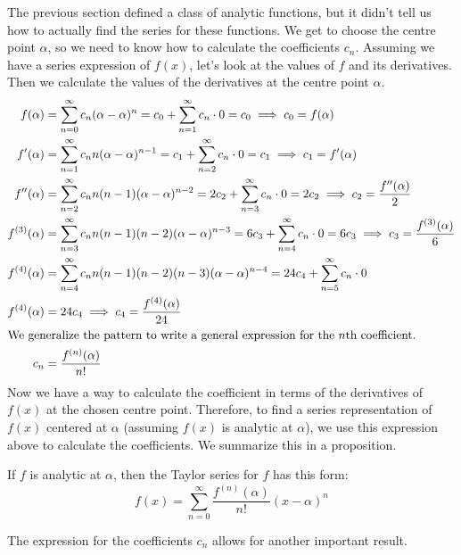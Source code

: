 \documentclass[fleqn]{report}
\begin{document}
The previous section defined a class of analytic functions,
but it didn't tell us how to actually find the series for
these functions. We get to choose the centre point $\alpha$,
so we need to know how to calculate the
coefficients $c_n$. Assuming we have a series expression of
$f(x)$, let's look at the values of $f$ and its derivatives.
Then we calculate the values of the derivatives at the centre
point $\alpha$. 
\begin{align*}
f(\alpha) & = \sum_{n=0}^\infty c_n (\alpha-\alpha)^n = c_0 +
\sum_{n=1}^\infty c_n \cdot 0 = c_0 \implies c_0 = f(\alpha)
\\
f^{\prime} (\alpha) & = \sum_{n=1}^\infty c_n n
(\alpha-\alpha)^{n-1} = c_1 + \sum_{n=2}^\infty c_n \cdot 0 =
c_1 \implies c_1 = f^\prime(\alpha) \\
f^{\prime \prime} (\alpha) & = \sum_{n=2}^\infty c_n n (n-1)
(\alpha-\alpha)^{n-2} = 2c_2 + \sum_{n=3}^\infty c_n \cdot 0 =
2c_2 \implies c_2 = \frac{f^{\prime\prime}(\alpha)}{2} \\
f^{(3)} (\alpha) & = \sum_{n=3}^\infty c_n n (n-1) (n-2)
(\alpha-\alpha)^{n-3} = 6c_3 + \sum_{n=4}^\infty c_n \cdot 0 =
6c_3 \implies c_3 = \frac{f^{(3)}(\alpha)}{6} \\
f^{(4)} (\alpha) & = \sum_{n=4}^\infty c_n n (n-1) (n-2) (n-3)
(\alpha-\alpha)^{n-4} = 24c_4 + \sum_{n=5}^\infty c_n \cdot 0
\\
f^{(4)} (\alpha) & = 24c_4 \implies c_4 =
\frac{f^{(4)}(\alpha)}{24} \\
\intertext{We generalize the pattern to write a general
expression for the $n$th coefficient.}
c_n & = \frac{f^{(n)}(\alpha)}{n!} 
\end{align*}
Now we have a way to calculate the coefficient in terms of
the derivatives of $f(x)$ at the chosen centre point.
Therefore, to find a series representation of $f(x)$ centered
at $\alpha$ (assuming $f(x)$ is analytic at $\alpha$), we use
this expression above to calculate the coefficients. We
summarize this in a proposition.

\begin{prop}
If $f$ is analytic at $\alpha$, then the Taylor series for $f$
has this form:
\begin{equation*}
f(x) = \sum_{n=0}^\infty \frac{f^{(n)}(\alpha)}{n!}
(x-\alpha)^n
\end{equation*}
\end{prop}

The expression for the coefficients $c_n$ allows for another
important result.
\end{document}
